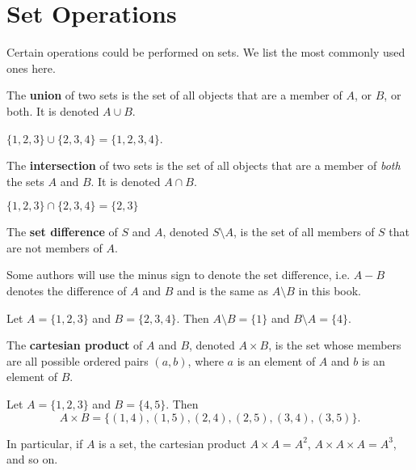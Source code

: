 \newpage

\section{Set Operations}
Certain operations could be performed on sets. We list the most commonly used ones here.

\begin{definition}
    The \textbf{union} of two sets is the set of all objects that are a member of $A$, or $B$, or both. It is denoted $A \cup B$.
\end{definition}
\begin{example}
    $\{1, 2, 3\} \cup \{2, 3, 4\} = \{1, 2, 3, 4\}$.
\end{example}

\begin{definition}
    The \textbf{intersection} of two sets is the set of all objects that are a member of \textit{both} the sets $A$ and $B$. It is denoted $A \cap B$.
\end{definition}
\begin{example}
    $\{1, 2, 3\} \cap \{2, 3, 4\} = \{2, 3\}$
\end{example}

\begin{definition}
    The \textbf{set difference} of $S$ and $A$, denoted $S \setminus A$, is the set of all members of $S$ that are not members of $A$.
\end{definition}
\begin{remark}
    Some authors will use the minus sign to denote the set difference, i.e. $A - B$ denotes the difference of $A$ and $B$ and is the same as $A \setminus B$ in this book.
\end{remark}
\begin{example}
    Let $A = \{1, 2, 3\}$ and $B = \{2, 3, 4\}$. Then $A \setminus B = \{1\}$ and $B \setminus A = \{4\}$.
\end{example}

\begin{definition}
    The \textbf{cartesian product} of $A$ and $B$, denoted $A \times B$, is the set whose members are all possible ordered pairs $(a, b)$, where $a$ is an element of $A$ and $b$ is an element of $B$.
\end{definition}
\begin{example}
    Let $A = \{1, 2, 3\}$ and $B = \{4, 5\}$. Then
    \[
        A \times B = \{(1, 4), (1, 5), (2, 4), (2, 5), (3, 4), (3, 5)\}.
    \]
\end{example}
\begin{remark}
    In particular, if $A$ is a set, the cartesian product $A \times A = A^2$, $A\times A \times A = A^3$, and so on.
\end{remark}

